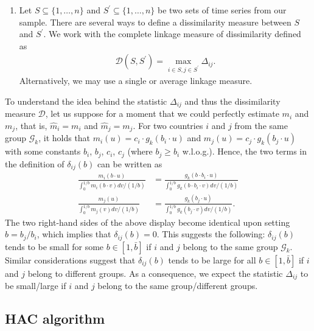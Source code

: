 \documentclass[a4paper,12pt]{article}
\numberwithin{equation}{section}
\begin{document}
\begin{enumerate}[label=\textit{Step \arabic*.},leftmargin=1.45cm]
\item Let $S \subseteq \{1, \ldots, n\}$ and $S^\prime \subseteq \{1, \ldots, n\}$ be two sets of time series from our sample. There are several ways to define a dissimilarity measure between $S$ and $S^\prime$. We work with the complete linkage measure of dissimilarity defined as 
\begin{align*}
\mathcal{D} (S, S^\prime) = \max_{i \in S, j\in S^\prime} \Delta_{ij}.
\end{align*}
Alternatively, we may use a single or average linkage measure. 


\end{enumerate}


To understand the idea behind the statistic $\Delta_{ij}$ and thus the dissimilarity measure $\mathcal{D}$, let us suppose for a moment that we could perfectly estimate $m_i$ and $m_j$, that is, $\hat{m}_i = m_i$ and $\hat{m}_j = m_j$. For two countries $i$ and $j$ from the same group $\mathcal{G}_k$, it holds that $m_i(u) = c_i \cdot g_k(b_i \cdot u)$ and $m_j(u) = c_j \cdot g_k(b_j \cdot u)$ with some constants $b_i$, $b_j$, $c_i$, $c_j$ (where $b_j \ge b_i$ w.l.o.g.). Hence, the two terms in the definition of $\delta_{ij}(b)$ can be written as  
\begin{align*}
\frac{m_i (b\cdot u)}{\int_0^{1/b} m_i(b\cdot v) dv /(1/b)} & = \frac{g_k (b \cdot b_i \cdot u)}{\int_0^{1/b} g_k(b \cdot b_i \cdot v) dv /(1/b)} \\
\frac{m_j (u)}{\int_0^{1/b} m_j(v) dv /(1/b)} & = \frac{g_k (b_j \cdot u)}{\int_0^{1/b} g_k(b_j \cdot v) dv /(1/b)}.
\end{align*}
The two right-hand sides of the above display become identical upon setting $b = b_j/b_i$, which implies that $\delta_{ij}(b) = 0$. This suggests the following: $\delta_{ij}(b)$ tends to be small for some $b \in [1,\bar{b}]$ if $i$ and $j$ belong to the same group $\mathcal{G}_k$. Similar considerations suggest that $\delta_{ij}(b)$ tends to be large for all $b \in [1,\bar{b}]$ if $i$ and $j$ belong to different groups. As a consequence, we expect the statistic $\Delta_{ij}$ to be small/large if $i$ and $j$ belong to the same group/different groups. 



\subsection{HAC algorithm}\label{sec:alg}
\end{document}
